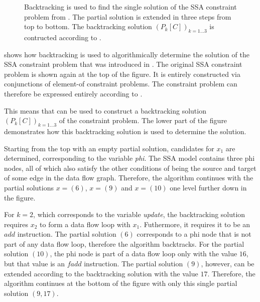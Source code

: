 \begin{figure}[p]
    
    \caption{Backtracking is used to find the single solution of the SSA
             constraint problem from .
             The partial solution is extended in three steps from top to bottom.
             The backtracking solution $(P_k[C])_{k=1\dots3}$ is contructed
             according to .}
    \label{fig:backtracsol}
\end{figure}

     shows how backtracking is used to algorithmically
    determine the solution of the SSA constraint problem that was introduced in
    .
    The original SSA constraint problem is shown again at the top of the figure.
    It is entirely constructed via conjunctions of element-of constraint
    problems.
    The constraint problem can therefore be expressed entirely according to
    .

    This means that  can be used to
    construct a backtracking solution $(P_k[C])_{k=1\dots3}$ of the constraint
    problem.
    The lower part of the figure demonstrates how this backtracking solution is
    used to determine the solution.

    Starting from the top with an empty partial solution, candidates for $x_1$
    are determined, corresponding to the variable {\em phi}.
    The SSA model contains three phi nodes, all of which also satisfy the other
    conditions of being the source and target of some edge in the data flow
    graph.
    Therefore, the algorithm continues with the partial solutions $x=(6)$,
    $x=(9)$ and $x=(10)$ one level further down in the figure.

    For $k=2$, which corresponds to the variable {\em update}, the backtracking
    solution requires $x_2$ to form a data flow loop with $x_1$.
    Futhermore, it requires it to be an $add$ instruction.
    The partial solution $(6)$ corresponds to a phi node that is not part of
    any data flow loop, therefore the algorithm backtracks.
    For the partial solution $(10)$, the phi node is part of a data flow loop
    only with the value $16$, but that value is an $fadd$ instruction.
    The partial solution $(9)$, however, can be extended according to the
    backtracking solution with the value $17$.
    Therefore, the algorithm continues at the bottom of the figure with only
    this single partial solution $(9,17)$.

